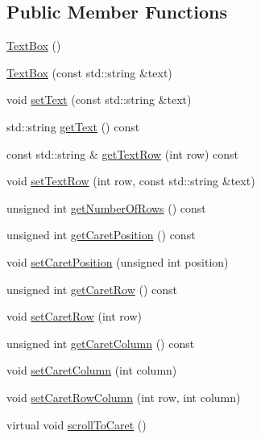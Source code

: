 \subsection*{Public Member Functions}
\begin{DoxyCompactItemize}
\item 
\hyperlink{classgcn_1_1TextBox_a044e6e940281e4ceaffcae8bd90840ec}{Text\+Box} ()
\item 
\hyperlink{classgcn_1_1TextBox_a1dec245909ffce79345c5e0db8acf88c}{Text\+Box} (const std\+::string \&text)
\item 
void \hyperlink{classgcn_1_1TextBox_ad3cb5f67a03c837562588e144a6abf14}{set\+Text} (const std\+::string \&text)
\item 
std\+::string \hyperlink{classgcn_1_1TextBox_a50edf6ff72e969b456d4b006f0c3b905}{get\+Text} () const 
\item 
const std\+::string \& \hyperlink{classgcn_1_1TextBox_a5aa3e2cbf139934a3198dff9de2e45fe}{get\+Text\+Row} (int row) const 
\item 
void \hyperlink{classgcn_1_1TextBox_ae9f71f3fd6f8bc694c9d98bfa7591c70}{set\+Text\+Row} (int row, const std\+::string \&text)
\item 
unsigned int \hyperlink{classgcn_1_1TextBox_a3686468329e7876134ef40a0e152ff7c}{get\+Number\+Of\+Rows} () const 
\item 
unsigned int \hyperlink{classgcn_1_1TextBox_a22d3bee0ef037ade82d01b00cb8a3190}{get\+Caret\+Position} () const 
\item 
void \hyperlink{classgcn_1_1TextBox_a64d6c26220f82c38e81bbbf5850bcc09}{set\+Caret\+Position} (unsigned int position)
\item 
unsigned int \hyperlink{classgcn_1_1TextBox_a8c873587b9f753fb1ece3704fb19156d}{get\+Caret\+Row} () const 
\item 
void \hyperlink{classgcn_1_1TextBox_ad3aa6f6441a9458ed3b865dccdfd649b}{set\+Caret\+Row} (int row)
\item 
unsigned int \hyperlink{classgcn_1_1TextBox_acefbe0e0fac5654bc556c9f3fadd77a0}{get\+Caret\+Column} () const 
\item 
void \hyperlink{classgcn_1_1TextBox_a3497f05fdc98486d8656e8787fa48a10}{set\+Caret\+Column} (int column)
\item 
void \hyperlink{classgcn_1_1TextBox_a1ec3dabc57b1a5e438626c1cf9ac6b59}{set\+Caret\+Row\+Column} (int row, int column)
\item 
virtual void \hyperlink{classgcn_1_1TextBox_aa45229d09fa814fc162d9d69c7311f5b}{scroll\+To\+Caret} ()
\item 

\end{DoxyCompactItemize}

